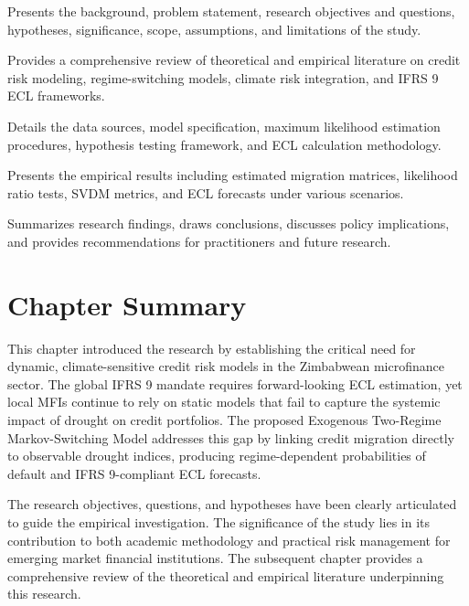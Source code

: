 \documentclass[12pt,a4paper]{article}
\begin{document}
\begin{description}[noitemsep]
    \item[Chapter 1: Introduction] Presents the background, problem statement, research objectives and questions, hypotheses, significance, scope, assumptions, and limitations of the study.
    
    \item[Chapter 2: Literature Review] Provides a comprehensive review of theoretical and empirical literature on credit risk modeling, regime-switching models, climate risk integration, and IFRS 9 ECL frameworks.
    
    \item[Chapter 3: Research Methodology] Details the data sources, model specification, maximum likelihood estimation procedures, hypothesis testing framework, and ECL calculation methodology.
    
    \item[Chapter 4: Data Analysis and Presentation] Presents the empirical results including estimated migration matrices, likelihood ratio tests, SVDM metrics, and ECL forecasts under various scenarios.
    
    \item[Chapter 5: Conclusions and Recommendations] Summarizes research findings, draws conclusions, discusses policy implications, and provides recommendations for practitioners and future research.
\end{description}

\section{Chapter Summary}

This chapter introduced the research by establishing the critical need for dynamic, climate-sensitive credit risk models in the Zimbabwean microfinance sector. The global IFRS 9 mandate requires forward-looking ECL estimation, yet local MFIs continue to rely on static models that fail to capture the systemic impact of drought on credit portfolios. The proposed Exogenous Two-Regime Markov-Switching Model addresses this gap by linking credit migration directly to observable drought indices, producing regime-dependent probabilities of default and IFRS 9-compliant ECL forecasts.

The research objectives, questions, and hypotheses have been clearly articulated to guide the empirical investigation. The significance of the study lies in its contribution to both academic methodology and practical risk management for emerging market financial institutions. The subsequent chapter provides a comprehensive review of the theoretical and empirical literature underpinning this research.
\end{document}
